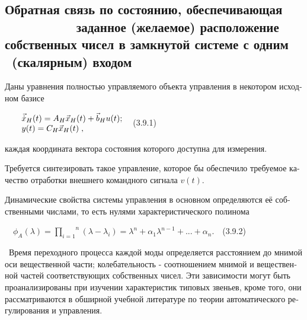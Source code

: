 \documentclass[a4paper]{article}
\begin{document}
\clearpage\subsection[Обратная связь по состоянию, обеспечивающая \ \ \ \ \ \ \ \ \ \ заданное (желаемое) расположение
собственных чисел в замкнутой системе с одним \ (скалярным) входом ]{Обратная связь по состоянию, обеспечивающая
\ \ \ \ \ \ \ \ \ \ заданное (желаемое) расположение собственных чисел в замкнутой системе с одним \ (скалярным) входом
}
\hypertarget{RefHeadingToc455659743}{}{\begin{russian}\sffamily
Даны уравнения полностью управляемого объекта управления в некотором исходном базисе
\end{russian}}

{\begin{russian}\sffamily
\ \ \ \  $\begin{matrix}\vec{\dot x}_H(t)=A_H\vec x_H(t)+\vec b_Hu(t);\hfill\null \\y(t)=C_H\vec x_H(t)\;,\hfill\null
\end{matrix}\hfill $\ \ (3.9.1)
\end{russian}}

{\begin{russian}\sffamily
каждая координата вектора состояния которого доступна для измерения.
\end{russian}}

{\begin{russian}\sffamily
Требуется синтезировать такое управление, которое бы обеспе­чило требуемое качество отработки внешнего командного
сигнала  $v(t)$.
\end{russian}}

{\begin{russian}\sffamily
Динамические свойства системы управления в основном определяются её собственными числами, то есть нулями
характеристического полинома
\end{russian}}

{\begin{russian}\sffamily
\ \  $ϕ_A\left(λ\right)=\overset n{\underset{i=1}{\prod }}\left(λ-λ_i\right)=λ^n+α_1λ^{n-1}+...+α_n$.\ \ (3.9.2)
\end{russian}}

{\begin{russian}\sffamily
\ Время переходного процесса каждой моды определяется расстоянием до мнимой оси вещественной части; колебательность -
соотношением мнимой и вещественной частей соответствующих собственных чисел. Эти зависимости могут быть
проанализированы при изучении характеристик типовых звеньев, кроме того, они рассматриваются в обширной учебной
литературе по теории автоматического регулирования и управления.
\end{russian}}
\end{document}
